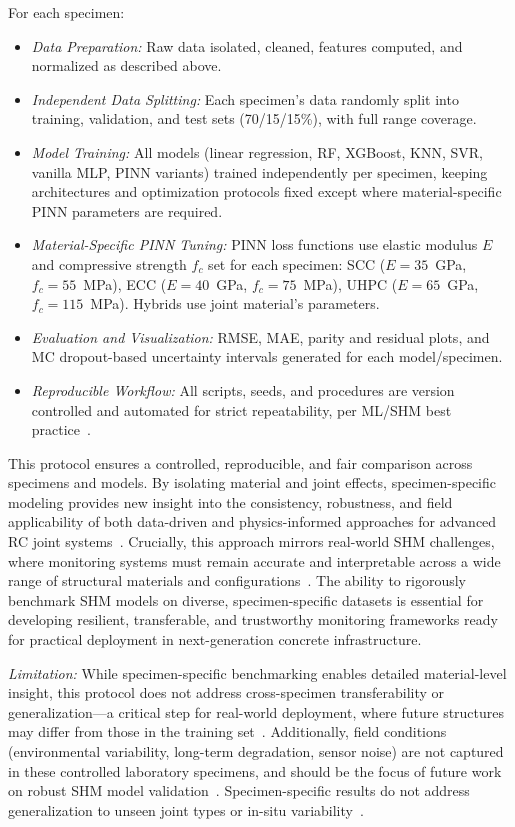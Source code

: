 \documentclass{article}
\begin{document}
For each specimen:
\begin{itemize}
    \item \emph{Data Preparation:} Raw data isolated, cleaned, features computed, and normalized as described above.
    \item \emph{Independent Data Splitting:} Each specimen’s data randomly split into training, validation, and test sets (70/15/15\%), with full range coverage.
    \item \emph{Model Training:} All models (linear regression, RF, XGBoost, KNN, SVR, vanilla MLP, PINN variants) trained independently per specimen, keeping architectures and optimization protocols fixed except where material-specific PINN parameters are required.
    \item \emph{Material-Specific PINN Tuning:} PINN loss functions use elastic modulus $E$ and compressive strength $f_c$ set for each specimen: SCC ($E=35$~GPa, $f_c=55$~MPa), ECC ($E=40$~GPa, $f_c=75$~MPa), UHPC ($E=65$~GPa, $f_c=115$~MPa). Hybrids use joint material’s parameters.
    \item \emph{Evaluation and Visualization:} RMSE, MAE, parity and residual plots, and MC dropout-based uncertainty intervals generated for each model/specimen.
    \item \emph{Reproducible Workflow:} All scripts, seeds, and procedures are version controlled and automated for strict repeatability, per ML/SHM best practice~\cite{Masri2021Emerging, geron2019, Goodfellow2016}.
\end{itemize}
This protocol ensures a controlled, reproducible, and fair comparison across specimens and models. By isolating material and joint effects, specimen-specific modeling provides new insight into the consistency, robustness, and field applicability of both data-driven and physics-informed approaches for advanced RC joint systems~\cite{Chao2024, fan2023pinn, Xu2024, wang2025gnn, Smarsly2023DigitalTwin}. Crucially, this approach mirrors real-world SHM challenges, where monitoring systems must remain accurate and interpretable across a wide range of structural materials and configurations~\cite{Ni2019, bennett2022interpretable, Yang2023}. The ability to rigorously benchmark SHM models on diverse, specimen-specific datasets is essential for developing resilient, transferable, and trustworthy monitoring frameworks ready for practical deployment in next-generation concrete infrastructure.

\emph{Limitation:}  While specimen-specific benchmarking enables detailed material-level insight, this protocol does not address cross-specimen transferability or generalization---a critical step for real-world deployment, where future structures may differ from those in the training set~\cite{Li2023, Cuomo2022}. Additionally, field conditions (environmental variability, long-term degradation, sensor noise) are not captured in these controlled laboratory specimens, and should be the focus of future work on robust SHM model validation~\cite{su2024review, hosseinzadeh2024durability, abdelrahman2022deep}.
Specimen-specific results do not address generalization to unseen joint types or in-situ variability~\cite{Li2023, Cuomo2022}.
\end{document}
